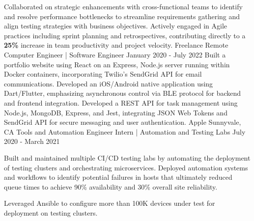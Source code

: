 \documentclass{resume}
\begin{document}
{{        \multibulletitem Collaborated on strategic enhancements with cross-functional teams to identify and resolve performance bottlenecks to streamline requirements gathering and align testing strategies with business objectives. Actively engaged in Agile practices including sprint planning and retrospectives, contributing directly to a \textbf{25\%} increase in team productivity and project velocity.
        \vspace{0.5em}%
    }
    \expdivider
    \experienceItem
    {Freelance}
    {Remote}
    {Computer Engineer | Software Engineer}
    {January 2020 - July 2022}
    {%
        \multibulletitem Built a portfolio website using React on an Express, Node.js server running within Docker containers, incorporating Twilio’s SendGrid API for email communications.
        \multibulletitem Developed an iOS/Android native application using Dart/Flutter, emphasizing asynchronous control via BLE protocol for backend and frontend integration.
        \multibulletitem Developed a REST API for task management using Node.js, MongoDB, Express, and Jest, integrating JSON Web Tokens and SendGrid API for secure messaging and user authentication.
    }
    \expdivider
    \experienceItem
    {Apple}
    {Sunnyvale, CA}
    {Tools and Automation Engineer Intern | Automation and Testing Labs}
    {July 2020 - March 2021}
    {%
        \item Built and maintained multiple CI/CD testing labs by automating the deployment of testing clusters and orchestrating microservices.
        \multibulletitem Deployed automation systems and workflows to identify potential failures in hosts that ultimately reduced queue times to achieve 90\% availability and 30\% overall site reliability.
        \item Leveraged Ansible to configure more than 100K devices under test for deployment on testing clusters.
    }

}


\end{document}
